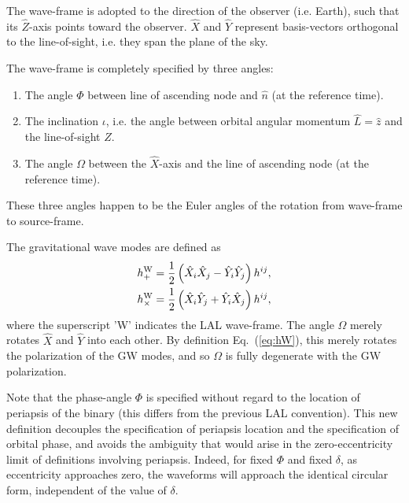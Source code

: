 \documentclass[11pt,tightenlines,article,amssymb,amsmath,amsfonts,superscriptaddress]{revtex4}
\newcommand{\nNR}{\hat{n}}
\newcommand{\lNR}{\hat L}
\newcommand{\EzS}{{{\hat z}}}
\newcommand{\ExW}{\hat X}
\newcommand{\EyW}{\hat Y}
\newcommand{\EzW}{\hat Z}
\newcommand{\hpW}{h_+^{\rm W}}
\newcommand{\hcW}{h_\times^{\rm W}}
\newcommand{\phiRef}{\Phi} %
\newcommand{\meanAnomaly}{\delta} %
\begin{document}
The wave-frame is adopted to the direction of the observer
(i.e. Earth), such that its $\EzW$-axis points toward the observer.
$\ExW$ and $\EyW$ represent basis-vectors orthogonal to the
line-of-sight, i.e. they span the plane of the sky.

The wave-frame is completely specified by three angles:
\begin{enumerate}
  \item The angle $\phiRef$ between line of ascending node and $\nNR$
    (at the reference time). 
  \item The inclination $\iota$, i.e. the angle between orbital
    angular momentum $\lNR=\EzS$ and the line-of-sight $\EzW$.
  \item The angle $\Omega$ between the $\ExW$-axis and the line of
    ascending node (at the reference time).
\end{enumerate}
These three angles happen to be the Euler angles of the rotation from
wave-frame to source-frame.

The gravitational wave modes are defined as
\begin{subequations}
  \label{eq:hW}
  \begin{align}
       \hpW &= \frac{1}{2}\left(\ExW_i\ExW_j-\EyW_i\EyW_j\right)h^{ij},\\
       \hcW &= \frac{1}{2}\left(\ExW_i\EyW_j+\EyW_i\ExW_j\right)h^{ij},
  \end{align}
\end{subequations}
where the superscript 'W' indicates the LAL wave-frame.  The angle
$\Omega$ merely rotates $\ExW$ and $\EyW$ into each other.  By
definition Eq.~(\ref{eq:hW}), this merely rotates the polarization of
the GW modes, and so $\Omega$ is fully degenerate with the GW
polarization.




Note that the phase-angle $\phiRef$ is specified without regard to the
location of periapsis of the binary (this differs from the previous LAL
convention).  This new definition decouples the specification of
periapsis location and the specification of orbital phase, and avoids
the ambiguity that would arise in the zero-eccentricity limit of
definitions involving periapsis. Indeed, for fixed $\phiRef$ and fixed
$\meanAnomaly$, as eccentricity approaches zero, the waveforms will
approach the identical circular form, independent of the value of
$\meanAnomaly$.
\end{document}
